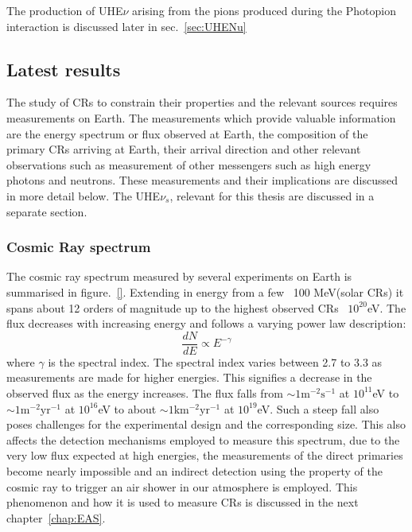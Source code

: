 The production of UHE$\nu$ arising from the pions produced during the Photopion interaction is discussed later in sec.~\ref{sec:UHENu} 

\subsection{Latest results}
\label{subsec:CRresults}
The study of CRs to constrain their properties and the relevant sources requires measurements on Earth. The measurements which provide valuable information are the energy spectrum or flux observed at Earth, the composition of the primary CRs arriving at Earth, their arrival direction and other relevant observations such as measurement of other messengers such as high energy photons and neutrons. These measurements and their implications are discussed in more detail below. The UHE$\nu_s$, relevant for this thesis are discussed in a separate section. 

\subsubsection*{Cosmic Ray spectrum}
\label{subsubsec:CRspectrum}
The cosmic ray spectrum measured by several experiments on Earth is summarised in figure.~\ref{}. Extending in energy from a few ~100 MeV(solar CRs) it spans about 12 orders of magnitude up to the highest observed CRs ~$10^{20}$eV. The flux decreases with increasing energy and follows a varying power law description:
\begin{equation}\label{eq:Powlaw}
  \frac{dN}{dE} \propto E^{-\gamma}   
\end{equation}
where $\gamma$ is the spectral index. The spectral index varies between 2.7 to 3.3 as measurements are made for higher energies. This signifies a decrease in the observed flux as the energy increases. The flux falls from $\mathrm{\sim 1m^{-2} s^{-1}}$ at $10^{11}$eV to $\mathrm{\sim 1m^{-2} yr^{-1}}$ at $10^{16}$eV to about $\mathrm{\sim 1km^{-2} yr^{-1}}$ at $10^{19}$eV. Such a steep fall also poses challenges for the experimental design and the corresponding size. This also affects the detection mechanisms employed to measure this spectrum, due to the very low flux expected at high energies, the measurements of the direct primaries become nearly impossible and an indirect detection using the property of the cosmic ray to trigger an air shower in our atmosphere is employed. This phenomenon and how it is used to measure CRs is discussed in the next chapter~\ref{chap:EAS}.

